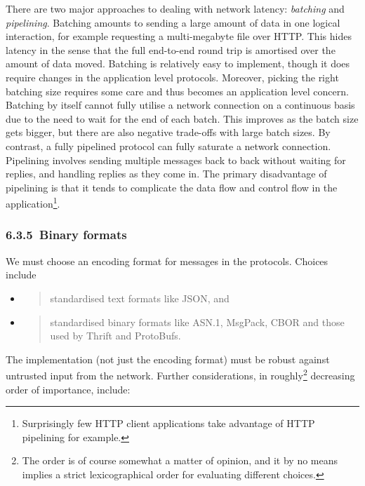 \documentclass[]{article}
\begin{document}
There are two major approaches to dealing with network latency:
\emph{batching} and \emph{pipelining}. Batching amounts to sending a
large amount of data in one logical interaction, for example requesting
a multi-megabyte file over HTTP. This hides latency in the sense that
the full end-to-end round trip is amortised over the amount of data
moved. Batching is relatively easy to implement, though it does require
changes in the application level protocols. Moreover, picking the right
batching size requires some care and thus becomes an application level
concern. Batching by itself cannot fully utilise a network connection on
a continuous basis due to the need to wait for the end of each batch.
This improves as the batch size gets bigger, but there are also negative
trade-offs with large batch sizes. By contrast, a fully pipelined
protocol can fully saturate a network connection. Pipelining involves
sending multiple messages back to back without waiting for replies, and
handling replies as they come in. The primary disadvantage of pipelining
is that it tends to complicate the data flow and control flow in the
application\footnote{Surprisingly few HTTP client applications take
  advantage of HTTP pipelining for example.}.

\hypertarget{binary-formats}{%
\subsubsection{​6.3.5​~Binary formats}\label{binary-formats}}

We must choose an encoding format for messages in the protocols. Choices
include

\begin{itemize}
\item
  \begin{quote}
  standardised text formats like JSON, and
  \end{quote}
\item
  \begin{quote}
  standardised binary formats like ASN.1, MsgPack, CBOR and those used
  by Thrift and ProtoBufs.
  \end{quote}
\end{itemize}

The implementation (not just the encoding format) must be robust against
untrusted input from the network. Further considerations, in
roughly\footnote{The order is of course somewhat a matter of opinion,
  and it by no means implies a strict lexicographical order for
  evaluating different choices.} decreasing order of importance,
include:
\end{document}
